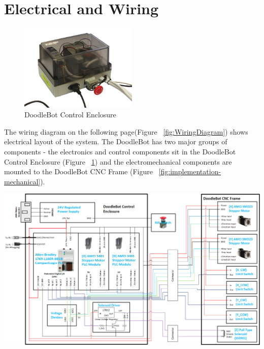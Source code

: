 \section{Electrical and Wiring}

	\begin{figure}[h]
		\centering
		\includegraphics[width=0.5\textwidth]{figures/cncMachine/control.jpg}
		\caption{DoodleBot Control Enclosure}
		\label{fig:control}
	\end{figure}
	
	The wiring diagram on the following page(Figure ~\ref{fig:WiringDiagram}) shows electrical layout of the system. The DoodleBot has two major groups of components - the electronics and control components sit in the DoodleBot Control Enclosure (Figure ~\ref{fig:control}) and the electromechanical components are mounted to the DoodleBot CNC Frame (Figure ~\ref{fig:implementation-mechanical}).

	
\begin{landscape}
		\vspace*{\fill}
		\includegraphics[width=\hsize]{figures/cncMachine/wiring}
		\label{fig:WiringDiagram}
		\vspace*{\fill}
\end{landscape}


